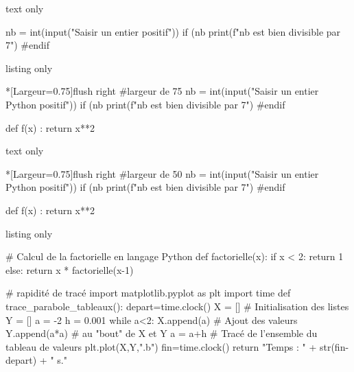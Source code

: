 \documentclass[a4paper,french,11pt]{article}
\begin{document}
\begin{PresCodeSortiePL}{text only}
\begin{CodePythonLst}[PremLigne=10]{}
nb = int(input("Saisir un entier positif"))
if (nb %
	print(f"{nb} est bien divisible par 7")
#endif
\end{CodePythonLst}
\end{PresCodeSortiePL}

\begin{PresCodeTexPL}{listing only}
\begin{CodePythonLstAlt}*[Largeur=0.75\linewidth]{flush right}
#largeur de 75%
nb = int(input("Saisir un entier Python positif"))
if (nb %
	print(f"{nb} est bien divisible par 7")
#endif

def f(x) :
	return x**2
\end{CodePythonLstAlt}
\end{PresCodeTexPL}

\begin{PresCodeSortiePL}{text only}
\begin{CodePythonLstAlt}*[Largeur=0.75\linewidth]{flush right}
#largeur de 50%
nb = int(input("Saisir un entier Python positif"))
if (nb %
	print(f"{nb} est bien divisible par 7")
#endif

def f(x) :
	return x**2
\end{CodePythonLstAlt}
\end{PresCodeSortiePL}

\begin{PresCodeTexPL}{listing only}
\begin{scontents}[overwrite,write-out=testscript.py]
# Calcul de la factorielle en langage Python
def factorielle(x):
	if x < 2:
		return 1
	else:
		return x * factorielle(x-1)

# rapidité de tracé
import matplotlib.pyplot as plt
import time
def trace_parabole_tableaux():
	depart=time.clock()
	X = [] # Initialisation des listes
	Y = []
	a = -2
	h = 0.001
	while a<2:
		X.append(a) # Ajout des valeurs
		Y.append(a*a) # au "bout" de X et Y
		a = a+h
	# Tracé de l'ensemble du tableau de valeurs
	plt.plot(X,Y,".b")
	fin=time.clock()
	return "Temps : " + str(fin-depart) + " s."
\end{scontents}

\end{PresCodeTexPL}
\end{document}
